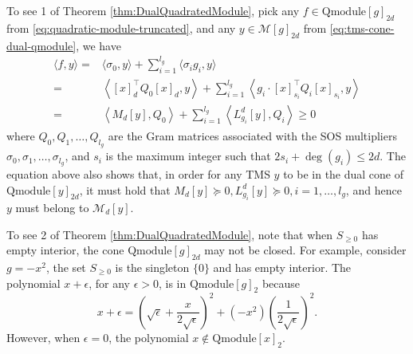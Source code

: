 \documentclass[
]{book}
\theoremstyle{definition}
\theoremstyle{definition}
\theoremstyle{definition}
\theoremstyle{definition}
\theoremstyle{remark}
\begin{document}
To see 1 of Theorem \ref{thm:DualQuadratedModule}, pick any \(f \in \mathrm{Qmodule}[g]_{2d}\) from \eqref{eq:quadratic-module-truncated}, and any \(y \in \mathcal{M}[g]_{2d}\) from \eqref{eq:tms-cone-dual-qmodule}, we have
\begin{equation}
\begin{split}
\langle f, y \rangle = & \langle \sigma_0, y \rangle + \sum_{i=1}^{l_g} \langle \sigma_i g_i, y \rangle \\
= & \left\langle [x]_d^\top Q_0 [x]_d, y \right\rangle + \sum_{i=1}^{l_g} \left\langle g_i \cdot [x]_{s_i}^\top Q_i [x]_{s_i}, y \right\rangle \\
= & \left\langle M_d[y], Q_0 \right\rangle + \sum_{i=1}^{l_g} \left\langle L^d_{g_i}[y], Q_i \right\rangle \geq 0
\end{split}
\end{equation}
where \(Q_0,Q_1,\dots,Q_{l_g}\) are the Gram matrices associated with the SOS multipliers \(\sigma_0,\sigma_1,\dots,\sigma_{l_g}\), and \(s_i\) is the maximum integer such that \(2 s_i + \deg (g_i) \leq 2d\). The equation above also shows that, in order for any TMS \(y\) to be in the dual cone of \(\mathrm{Qmodule}[y]_{2d}\), it must hold that \(M_d[y] \succeq 0, L^d_{g_i}[y] \succeq 0,i=1,\dots,l_g\), and hence \(y\) must belong to \(\mathcal{M}_d[y]\).

To see 2 of Theorem \ref{thm:DualQuadratedModule}, note that when \(S_{\geq 0}\) has empty interior, the cone \(\mathrm{Qmodule}[g]_{2d}\) may not be closed. For example, consider \(g = -x^2\), the set \(S_{\geq 0}\) is the singleton \(\{ 0 \}\) and has empty interior. The polynomial \(x + \epsilon\), for any \(\epsilon > 0\), is in \(\mathrm{Qmodule}[g]_2\) because
\[
x + \epsilon = \left( \sqrt{\epsilon} + \frac{x}{2 \sqrt{\epsilon}} \right)^2 + (-x^2) \left( \frac{1}{2 \sqrt{\epsilon}} \right)^2.
\]
However, when \(\epsilon = 0\), the polynomial \(x \not\in \mathrm{Qmodule}[x]_{2}\).
\end{document}
